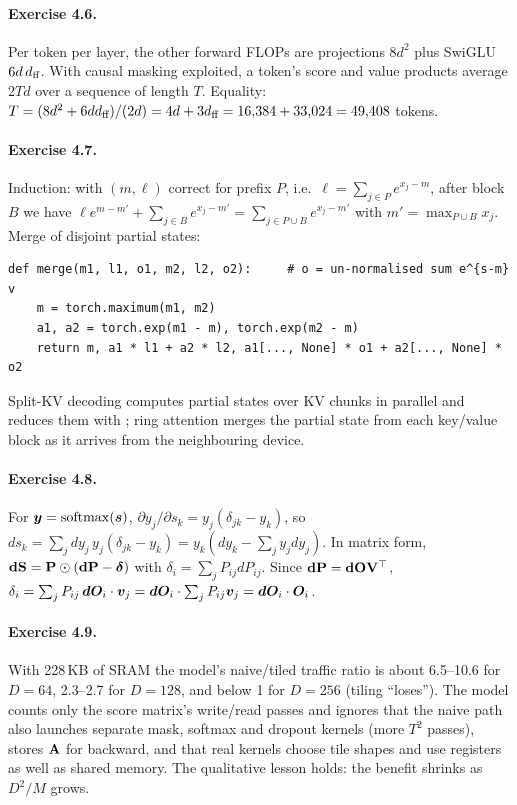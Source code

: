 \paragraph{Exercise 4.6.} Per token per layer, the other forward FLOPs are projections $8d^2$ plus SwiGLU
$6d\,d_{\text{ff}}$. With causal masking exploited, a token's score and value products average $2Td$ over a
sequence of length $T$. Equality: $T=(8d^2+6dd_{\text{ff}})/(2d)=4d+3d_{\text{ff}}=16{,}384+33{,}024=49{,}408$ tokens.

\paragraph{Exercise 4.7.} Induction: with $(m,\ell)$ correct for prefix $P$, i.e.\ $\ell=\sum_{j\in P}e^{x_j-m}$,
after block $B$ we have $\ell e^{m-m'}+\sum_{j\in B}e^{x_j-m'}=\sum_{j\in P\cup B}e^{x_j-m'}$ with
$m'=\max_{P\cup B}x_j$. Merge of disjoint partial states:
\begin{lstlisting}
def merge(m1, l1, o1, m2, l2, o2):     # o = un-normalised sum e^{s-m} v
    m = torch.maximum(m1, m2)
    a1, a2 = torch.exp(m1 - m), torch.exp(m2 - m)
    return m, a1 * l1 + a2 * l2, a1[..., None] * o1 + a2[..., None] * o2
\end{lstlisting}
Split-KV decoding computes partial states over KV chunks in parallel and reduces them with
; ring attention merges the partial state from each key/value block as it arrives from
the neighbouring device.

\paragraph{Exercise 4.8.} For $\bm{y}=\operatorname{softmax}(\bm{s})$, $\partial y_j/\partial s_k=y_j(\delta_{jk}-y_k)$, so
$ds_k=\sum_j dy_j\,y_j(\delta_{jk}-y_k)=y_k(dy_k-\sum_j y_j dy_j)$. In matrix form,
$\mathbf{dS}=\mathbf{P}\odot(\mathbf{dP}-\bm{\delta})$ with $\delta_i=\sum_jP_{ij}dP_{ij}$. Since $\mathbf{dP}=\mathbf{dO}\mathbf{V}^\top$,
$\delta_i=\sum_j P_{ij}\,\bm{dO}_i\cdot\bm{v}_j=\bm{dO}_i\cdot\sum_jP_{ij}\bm{v}_j=\bm{dO}_i\cdot\bm{O}_i$.

\paragraph{Exercise 4.9.} With 228\,KB of SRAM the model's naive/tiled traffic ratio is about
6.5--10.6 for $D=64$, 2.3--2.7 for $D=128$, and below 1 for $D=256$ (tiling ``loses''). The model
counts only the score matrix's write/read passes and ignores that the naive path also launches separate
mask, softmax and dropout kernels (more $T^2$ passes), stores $\mathbf{A}$ for backward, and that real
kernels choose tile shapes and use registers as well as shared memory. The qualitative lesson holds:
the benefit shrinks as $D^2/M$ grows.

